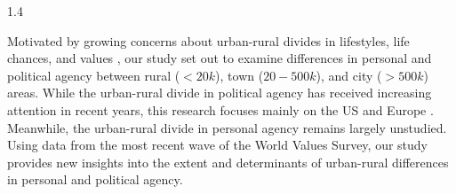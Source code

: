 \documentclass[10pt, letterpaper]{article}
\begin{document}
\begin{spacing}{1.4}



Motivated by growing concerns about urban-rural divides in lifestyles, life
chances, and values \citep[e.g.,][]{ulrich2021people,pile05,pile05B,pile99},
our study set out to examine differences in personal
and political agency between rural ($<20k$), town ($20-500k$), and city
($>500k$) areas. While the urban-rural divide in political
agency has received increasing attention in recent years, this research focuses mainly on the US and
Europe \citep[e.g.,][]{luukkonen2022urbanisation,rowland2024political}.
 Meanwhile, the urban-rural divide in
personal agency remains largely unstudied. Using data from the most recent wave of the World
Values Survey, our study provides new insights into the extent and determinants of urban-rural
differences in personal and political agency.


\end{spacing}
\end{document}
